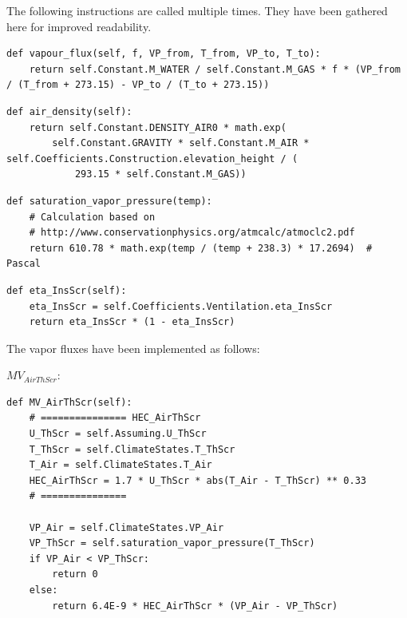 \documentclass[a4paper]{article}
\begin{document}
The following instructions are called multiple times.
They have been gathered here for improved readability.
\begin{mdframed}[leftline=false,rightline=false,backgroundcolor=magenta!10,nobreak=true]
  \begin{verbatim}
def vapour_flux(self, f, VP_from, T_from, VP_to, T_to):
    return self.Constant.M_WATER / self.Constant.M_GAS * f * (VP_from / (T_from + 273.15) - VP_to / (T_to + 273.15))
  \end{verbatim}
\end{mdframed}
\begin{mdframed}[leftline=false,rightline=false,backgroundcolor=magenta!10,nobreak=true]
  \begin{verbatim}
def air_density(self):
    return self.Constant.DENSITY_AIR0 * math.exp(
        self.Constant.GRAVITY * self.Constant.M_AIR * self.Coefficients.Construction.elevation_height / (
            293.15 * self.Constant.M_GAS))
  \end{verbatim}
\end{mdframed}
\begin{mdframed}[leftline=false,rightline=false,backgroundcolor=magenta!10,nobreak=true]
  \begin{verbatim}
def saturation_vapor_pressure(temp):
    # Calculation based on
    # http://www.conservationphysics.org/atmcalc/atmoclc2.pdf
    return 610.78 * math.exp(temp / (temp + 238.3) * 17.2694)  # Pascal
  \end{verbatim}
\end{mdframed}
\begin{mdframed}[leftline=false,rightline=false,backgroundcolor=magenta!10,nobreak=true]
  \begin{verbatim}
def eta_InsScr(self):
    eta_InsScr = self.Coefficients.Ventilation.eta_InsScr
    return eta_InsScr * (1 - eta_InsScr)
  \end{verbatim}
\end{mdframed}


The vapor fluxes have been implemented as follows:

\(MV_{AirThScr}\):
\begin{mdframed}[leftline=false,rightline=false,backgroundcolor=magenta!10,nobreak=true]
  \begin{verbatim}
def MV_AirThScr(self):
    # =============== HEC_AirThScr
    U_ThScr = self.Assuming.U_ThScr
    T_ThScr = self.ClimateStates.T_ThScr
    T_Air = self.ClimateStates.T_Air
    HEC_AirThScr = 1.7 * U_ThScr * abs(T_Air - T_ThScr) ** 0.33
    # ===============

    VP_Air = self.ClimateStates.VP_Air
    VP_ThScr = self.saturation_vapor_pressure(T_ThScr)
    if VP_Air < VP_ThScr:
        return 0
    else:
        return 6.4E-9 * HEC_AirThScr * (VP_Air - VP_ThScr)
  \end{verbatim}
\end{mdframed}
\end{document}
